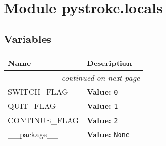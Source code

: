 %
%
%


\section{Module pystroke.locals}

    \label{pystroke:locals}


  \subsection{Variables}

    \vspace{-1cm}
\hspace{\varindent}\begin{longtable}{|p{\varnamewidth}|p{\vardescrwidth}|l}
\cline{1-2}
\cline{1-2} \centering \textbf{Name} & \centering \textbf{Description}& \\
\cline{1-2}
\endhead\cline{1-2}\multicolumn{3}{r}{\small\textit{continued on next page}}\\\endfoot\cline{1-2}
\endlastfoot\raggedright S\-W\-I\-T\-C\-H\-\_\-F\-L\-A\-G\- & \raggedright \textbf{Value:} 
{\tt 0}&\\
\cline{1-2}
\raggedright Q\-U\-I\-T\-\_\-F\-L\-A\-G\- & \raggedright \textbf{Value:} 
{\tt 1}&\\
\cline{1-2}
\raggedright C\-O\-N\-T\-I\-N\-U\-E\-\_\-F\-L\-A\-G\- & \raggedright \textbf{Value:} 
{\tt 2}&\\
\cline{1-2}
\raggedright \_\-\_\-p\-a\-c\-k\-a\-g\-e\-\_\-\_\- & \raggedright \textbf{Value:} 
{\tt None}&\\
\cline{1-2}
\end{longtable}

